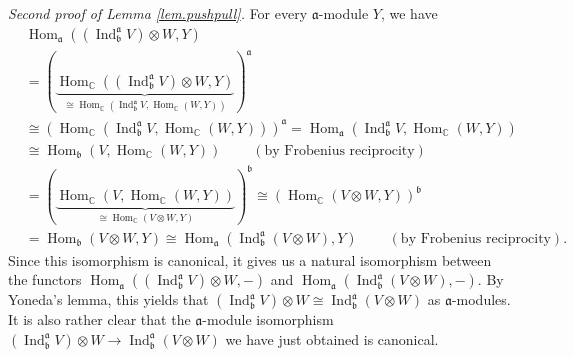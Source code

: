 \documentclass[etingof-lie.tex]{subfiles}
\begin{document}
\textit{Second proof of Lemma \ref{lem.pushpull}.} For every $\mathfrak{a}%
$-module $Y$, we have%
\begin{align*}
&  \operatorname*{Hom}\nolimits_{\mathfrak{a}}\left(  \left(
\operatorname*{Ind}\nolimits_{\mathfrak{b}}^{\mathfrak{a}}V\right)  \otimes
W,Y\right) \\
&  =\left(  \underbrace{\operatorname*{Hom}\nolimits_{\mathbb{C}}\left(
\left(  \operatorname*{Ind}\nolimits_{\mathfrak{b}}^{\mathfrak{a}}V\right)
\otimes W,Y\right)  }_{\cong\operatorname*{Hom}\nolimits_{\mathbb{C}}\left(
\operatorname*{Ind}\nolimits_{\mathfrak{b}}^{\mathfrak{a}}%
V,\operatorname*{Hom}\nolimits_{\mathbb{C}}\left(  W,Y\right)  \right)
}\right)  ^{\mathfrak{a}}\\
&  \cong\left(  \operatorname*{Hom}\nolimits_{\mathbb{C}}\left(
\operatorname*{Ind}\nolimits_{\mathfrak{b}}^{\mathfrak{a}}%
V,\operatorname*{Hom}\nolimits_{\mathbb{C}}\left(  W,Y\right)  \right)
\right)  ^{\mathfrak{a}}=\operatorname*{Hom}\nolimits_{\mathfrak{a}}\left(
\operatorname*{Ind}\nolimits_{\mathfrak{b}}^{\mathfrak{a}}%
V,\operatorname*{Hom}\nolimits_{\mathbb{C}}\left(  W,Y\right)  \right) \\
&  \cong\operatorname*{Hom}\nolimits_{\mathfrak{b}}\left(
V,\operatorname*{Hom}\nolimits_{\mathbb{C}}\left(  W,Y\right)  \right)
\ \ \ \ \ \ \ \ \ \ \left(  \text{by Frobenius reciprocity}\right) \\
&  =\left(  \underbrace{\operatorname*{Hom}\nolimits_{\mathbb{C}}\left(
V,\operatorname*{Hom}\nolimits_{\mathbb{C}}\left(  W,Y\right)  \right)
}_{\cong\operatorname*{Hom}\nolimits_{\mathbb{C}}\left(  V\otimes W,Y\right)
}\right)  ^{\mathfrak{b}}\cong\left(  \operatorname*{Hom}\nolimits_{\mathbb{C}%
}\left(  V\otimes W,Y\right)  \right)  ^{\mathfrak{b}}\\
&  =\operatorname*{Hom}\nolimits_{\mathfrak{b}}\left(  V\otimes W,Y\right)
\cong\operatorname*{Hom}\nolimits_{\mathfrak{a}}\left(  \operatorname*{Ind}%
\nolimits_{\mathfrak{b}}^{\mathfrak{a}}\left(  V\otimes W\right)  ,Y\right)
\ \ \ \ \ \ \ \ \ \ \left(  \text{by Frobenius reciprocity}\right)  .
\end{align*}
Since this isomorphism is canonical, it gives us a natural isomorphism between
the functors $\operatorname*{Hom}\nolimits_{\mathfrak{a}}\left(  \left(
\operatorname*{Ind}\nolimits_{\mathfrak{b}}^{\mathfrak{a}}V\right)  \otimes
W,-\right)  $ and $\operatorname*{Hom}\nolimits_{\mathfrak{a}}\left(
\operatorname*{Ind}\nolimits_{\mathfrak{b}}^{\mathfrak{a}}\left(  V\otimes
W\right)  ,-\right)  $. By Yoneda's lemma, this yields that $\left(
\operatorname*{Ind}\nolimits_{\mathfrak{b}}^{\mathfrak{a}}V\right)  \otimes
W\cong\operatorname*{Ind}\nolimits_{\mathfrak{b}}^{\mathfrak{a}}\left(
V\otimes W\right)  $ as $\mathfrak{a}$-modules. It is also rather clear that
the $\mathfrak{a}$-module isomorphism $\left(  \operatorname*{Ind}%
\nolimits_{\mathfrak{b}}^{\mathfrak{a}}V\right)  \otimes W\rightarrow
\operatorname*{Ind}\nolimits_{\mathfrak{b}}^{\mathfrak{a}}\left(  V\otimes
W\right)  $ we have just obtained is canonical.
\end{document}
